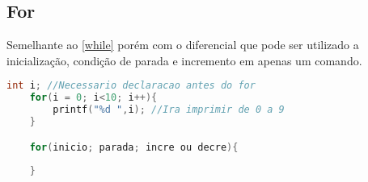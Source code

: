 \documentclass[12pt]{article}
\begin{document}
\subsection{For}
Semelhante ao \ref{while} porém com o diferencial que pode ser utilizado a inicialização, condição de parada e incremento em apenas um comando.
\begin{lstlisting}[language=C,mathescape=true]
	int i; //Necessario declaracao antes do for
	for(i = 0; i<10; i++){
		printf("%d ",i); //Ira imprimir de 0 a 9
	}

	for(inicio; parada; incre ou decre){
		
	}
\end{lstlisting}



\end{document}
